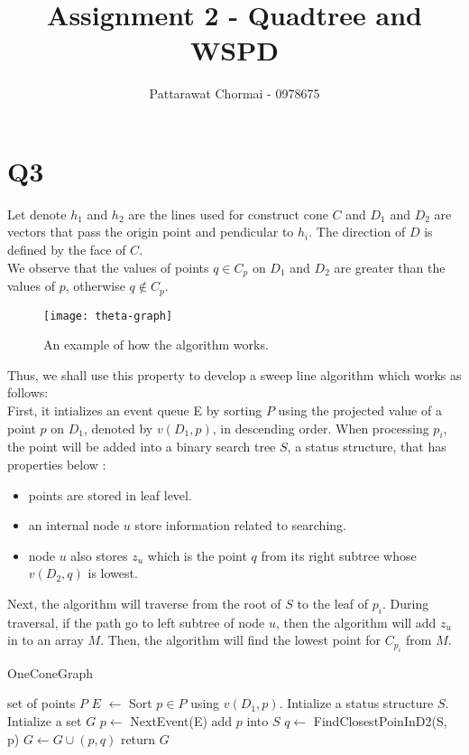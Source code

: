\documentclass[12pt]{article}
\begin{document}
\title{Assignment 2 - Quadtree and WSPD}
\author{
	Pattarawat Chormai - 0978675 \\
}
\maketitle

\section*{Q3}

Let denote $h_1$ and $h_2$ are the lines used for construct cone $C$ and $D_1$ and $D_2$
are vectors that pass the origin point and pendicular to $h_i$. The direction
of $D$ is defined by the face of $C$. \\

We observe that the values of points $q \in C_p$ on $D_1$ and $D_2$ are greater than
the values of $p$, otherwise $q \notin C_p$.

\begin{center}
    \label{figure1}
    \begin{figure}[h]
    \centering
    \texttt{[image: theta-graph]}\\
    \caption{An example of how the algorithm works.}
    \end{figure}
\end{center}

Thus, we shall use this property to develop a sweep line algorithm which works
as follows: \\

First, it intializes an event queue E by sorting $P$ using the projected value of a point $p$ 
on $D_1$, denoted by $v(D_1,p)$, in descending order. When processing $p_i$, the point will be added into a 
binary search tree $S$, a status structure, that has properties below :
\begin{itemize}
    \item points are stored in leaf level.
    \item an internal node $u$ store information related to searching.
    \item node $u$ also stores $z_u$ which is the point $q$ from its right subtree whose $v(D_2,q)$ is lowest.
\end{itemize}

Next, the algorithm will traverse from the root of $S$ to the leaf of $p_i$. During traversal,
if the path go to left subtree of node $u$, then the algorithm will add $z_u$ in to an array $M$.
Then, the algorithm will find the lowest point for $C_{p_i}$ from $M$.
%
\begin{algorithm}[h]
  \caption{OneConeGraph}
  \begin{algorithmic}
    \Require set of points $P$
    \State $E$ $\leftarrow$ Sort $p \in P$ using $v(D_1,p)$.
    \State Intialize a status structure $S$.
    \State Intialize a set $G$
        \State $p \leftarrow$ NextEvent(E)
        \State add $p$ into $S$
        \State $q \leftarrow$ FindClosestPoinInD2(S, p)
        \State $G \leftarrow G \cup { (p,q) }$
    \EndWhile
    \State return $G$
  \end{algorithmic}
\end{algorithm}
\end{document}
